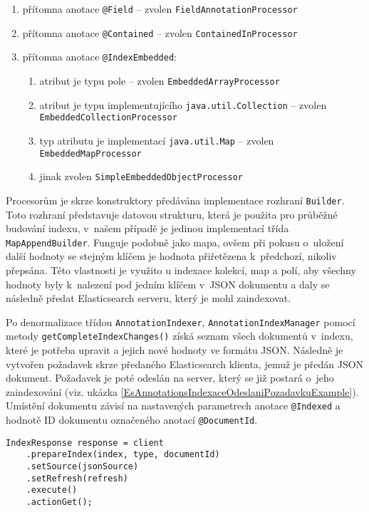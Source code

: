 \documentclass[11pt,oneside]{fithesis2}
\begin{document}
\begin{enumerate}
	\item přítomna anotace \texttt{@Field} -- zvolen \texttt{FieldAnnotationProcessor}
	\item přítomna anotace \texttt{@Contained} -- zvolen \texttt{ContainedInProcessor}
	\item přítomna anotace \texttt{@IndexEmbedded}:
	\begin{enumerate}
		\item atribut je typu pole -- zvolen \texttt{EmbeddedArrayProcessor}  
		\item atribut je typu implementujícího \texttt{java.util.Collection} -- zvolen \texttt{EmbeddedCollectionProcessor}  
		\item typ atributu je implementací \texttt{java.util.Map} -- zvolen \\ \texttt{EmbeddedMapProcessor} 
		\item jinak zvolen \texttt{SimpleEmbeddedObjectProcessor} 
	\end{enumerate}
\end{enumerate}

Procesorům je skrze konstruktory předávána implementace rozhraní \texttt{Builder}. Toto rozhraní představuje datovou strukturu, která je použita pro průběžné budování indexu, v~našem případě je jedinou implementací třída \texttt{MapAppendBuilder}. Funguje podobně jako mapa, ovšem při pokusu o~uložení další hodnoty se stejným klíčem je hodnota přiřetězena k~předchozí, nikoliv přepsána. Této vlastnosti je využito u indexace kolekcí, map a polí, aby všechny hodnoty byly k~nalezení pod jedním klíčem v~JSON dokumentu a daly se následně předat Elasticsearch serveru, který je mohl zaindexovat. 

Po denormalizace třídou \texttt{AnnotationIndexer}, \texttt{AnnotationIndexManager} pomocí metody \texttt{getCompleteIndexChanges()} získá seznam všech dokumentů v~indexu, které je potřeba upravit a jejich nové hodnoty ve formátu JSON. Následně je vytvořen požadavek skrze předaného Elasticsearch klienta, jemuž je předán JSON dokument. Požadavek je poté odeslán na server, který se již postará o~jeho zaindexování (viz. ukázka \ref{EsAnnotationsIndexaceOdeslaniPozadavkuExample}). Umístění dokumentu závisí na nastavených parametrech anotace \texttt{@Indexed} a hodnotě ID dokumentu označeného anotací \texttt{@DocumentId}.

\begin{lstlisting}[caption =  Odeslání požadavku na vytvoření/úpravu indexu, label = EsAnnotationsIndexaceOdeslaniPozadavkuExample]
IndexResponse response = client
	.prepareIndex(index, type, documentId)
	.setSource(jsonSource)
	.setRefresh(refresh)
	.execute()
	.actionGet();
\end{lstlisting}
\end{document}
